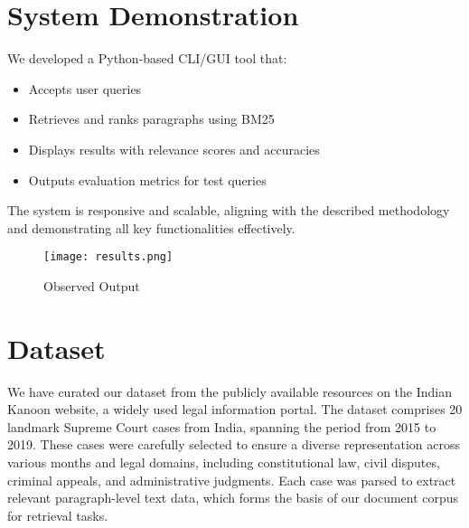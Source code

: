 \documentclass[12pt]{article}
\begin{document}
\section{System Demonstration}

We developed a Python-based CLI/GUI tool that:
\begin{itemize}[noitemsep]
    \item Accepts user queries
    \item Retrieves and ranks paragraphs using BM25
    \item Displays results with relevance scores and accuracies
    \item Outputs evaluation metrics for test queries
\end{itemize}

The system is responsive and scalable, aligning with the described methodology and demonstrating all key functionalities effectively.

\begin{figure}[t]
    \centering
    \texttt{[image: results.png]}
    \caption{Observed Output}
    \label{fig:enter-label}
\end{figure}

\section{Dataset}

 We have curated our dataset from the publicly available resources on the Indian Kanoon website, a widely used legal information portal. The dataset comprises 20 landmark Supreme Court cases from India, spanning the period from 2015 to 2019. These cases were carefully selected to ensure a diverse representation across various months and legal domains, including constitutional law, civil disputes, criminal appeals, and administrative judgments. Each case was parsed to extract relevant paragraph-level text data, which forms the basis of our document corpus for retrieval tasks.
\end{document}
